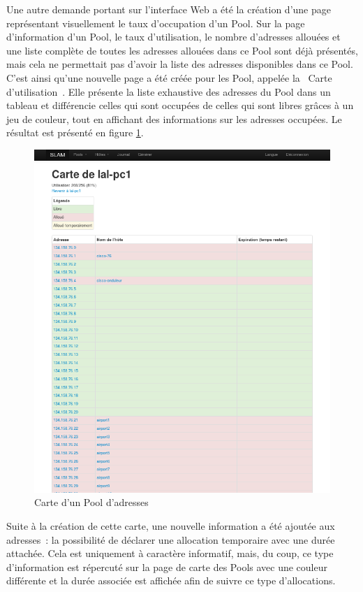 \documentclass[12pt,a4paper,twoside]{report}
\begin{document}
Une autre demande portant sur l’interface Web a été la création d’une page
représentant visuellement le taux d’occupation d’un Pool. Sur la page
d’information d’un Pool, le taux d’utilisation, le nombre d’adresses allouées
et une liste complète de toutes les adresses allouées dans ce Pool sont déjà
présentés, mais cela ne permettait pas d’avoir la liste des adresses
disponibles dans ce Pool. C’est ainsi qu’une nouvelle page a été créée pour les
Pool, appelée la \og~Carte d’utilisation~\fg. Elle présente la liste exhaustive
des adresses du Pool dans un tableau et différencie celles qui sont occupées de
celles qui sont libres grâces à un jeu de couleur, tout en affichant des
informations sur les adresses occupées. Le résultat est présenté en figure
\ref{fig:web3}.

\begin{figure}[hbt]
	\includegraphics[scale=0.45]{img/web3}
	\caption{Carte d’un Pool d’adresses}
	\label{fig:web3}
\end{figure}

Suite à la création de cette carte, une nouvelle information a été ajoutée aux
adresses~: la possibilité de déclarer une allocation temporaire avec une durée
attachée. Cela est uniquement à caractère informatif, mais, du coup, ce type
d’information est répercuté sur la page de carte des Pools avec une couleur
différente et la durée associée est affichée afin de suivre ce type
d’allocations.\\
\end{document}
